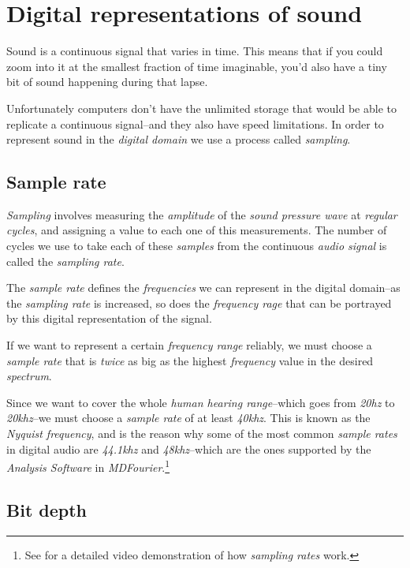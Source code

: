 \documentclass[10pt,a4paper]{report}
\newcommand{\hz}[1]{\textit{#1\acrshort{hz}}}
\newcommand{\khz}[1]{\textit{#1\acrshort{khz}}}
\begin{document}
\section{Digital representations of sound}

Sound is a continuous signal that varies in time. This means that if you could zoom into it at the smallest fraction of time imaginable, you'd also have a tiny bit of sound happening during that lapse. 

Unfortunately computers don't have the unlimited storage that would be able to replicate a continuous signal--and they also have speed limitations. In order to represent sound in the \textit{digital domain} we use a process called \textit{sampling}. 

\subsection{Sample rate}

\textit{Sampling} involves measuring the \textit{amplitude} of the \textit{sound pressure wave} at \textit{regular cycles}, and assigning a value to each one of this measurements. The number of cycles we use to take each of these \textit{samples} from the continuous \textit{audio signal} is called the \textit{sampling rate}. 

The \textit{sample rate} defines the \textit{frequencies} we can represent in the digital domain--as the \textit{sampling rate} is increased, so does the \textit{frequency rage} that can be portrayed by this digital representation of the signal. 

If we want to represent a certain \textit{frequency range} reliably, we must choose a \textit{sample rate} that is \textit{twice} as big as the highest \textit{frequency} value in the desired \textit{spectrum}.

Since we want to cover the whole \textit{human hearing range}--which goes from \hz{20} to \khz{20}--we must choose a \textit{sample rate} of at least \khz{40}. This is known as the \textit{Nyquist frequency}, and is the reason why some of the most common \textit{sample rates} in digital audio are \khz{44.1} and \khz{48}--which are the ones supported by the \textit{Analysis Software} in \textit{MDFourier}.\footnote{See \cite{MontyMontgomery} for a detailed video demonstration of how \textit{sampling rates} work.}


\subsection{Bit depth}
\end{document}
